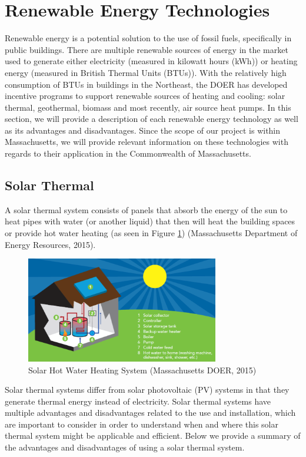   \section{Renewable Energy Technologies}
  \par Renewable energy is a potential solution to the use of fossil fuels, specifically in public buildings. There are multiple renewable sources of energy in the market used to generate either electricity (measured in kilowatt hours (kWh)) or heating energy (measured in British Thermal Units (BTUs)). With the relatively high consumption of BTUs in buildings in the Northeast, the DOER has developed incentive programs to support renewable sources of heating and cooling: solar thermal, geothermal, biomass and most recently, air source heat pumps. In this section, we will provide a description of each renewable energy technology as well as its advantages and disadvantages. Since the scope of our project is within Massachusetts, we will provide relevant information on these technologies with regards to their application in the Commonwealth of Massachusetts.

    \subsection{Solar Thermal}
    \par A solar thermal system consists of panels that absorb the energy of the sun to heat pipes with water (or another liquid) that then will heat the building spaces or provide hot water heating (as seen in Figure \ref{fig:solar}) (Massachusetts Department of Energy Resources, 2015).
    \begin{figure}[H]
      \centering
        \includegraphics[width=0.75\textwidth]{images/03-SolarHotWaterHeatingSystem}
      \caption{Solar Hot Water Heating System (Massachusetts DOER, 2015)}
      \label{fig:solar}
    \end{figure}
    \par Solar thermal systems differ from solar photovoltaic (PV) systems in that they generate thermal energy instead of electricity. Solar thermal systems have multiple advantages and disadvantages related to the use and installation, which are important to consider in order to understand when and where this solar thermal system might be applicable and efficient. Below we provide a summary of the advantages and disadvantages of using a solar thermal system.\\

